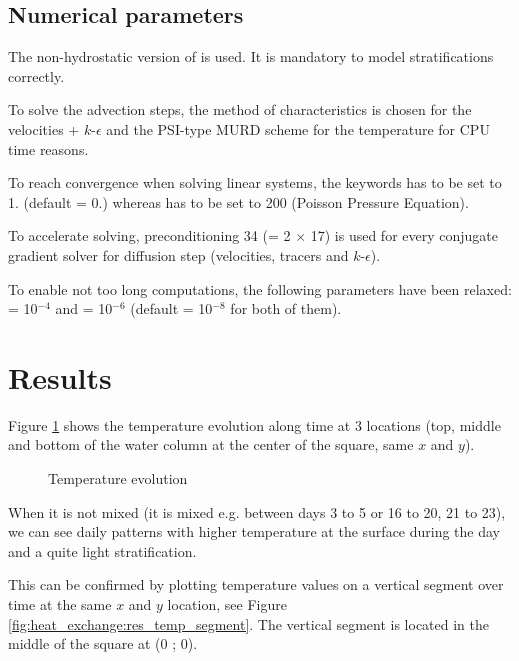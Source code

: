 \subsection{Numerical parameters}
%
The non-hydrostatic version of  is used.
It is mandatory to model stratifications correctly.

To solve the advection steps, the method of characteristics is chosen for the
velocities + $k$-$\epsilon$ and the PSI-type MURD scheme for the temperature
for CPU time reasons.

To reach convergence when solving linear systems, the keywords
 has to be set to 1. (default = 0.) whereas
 has to be set to 200 (Poisson
Pressure Equation).

To accelerate solving, preconditioning 34 (= 2 $\times$ 17) is used for
every conjugate gradient solver for diffusion step (velocities, tracers and
$k$-$\epsilon$).

To enable not too long computations, the following parameters have been relaxed:
 = 10$^{-4}$ and  = 10$^{-6}$
(default = 10$^{-8}$ for both of them).
%
%
\section{Results}
%
Figure \ref{fig:heat_exchange:res_evol} shows the temperature evolution along
time at 3 locations (top, middle and bottom of the water column at the center of
the square, same $x$ and $y$).

\begin{figure} [H]
\centering
{}
 \caption{Temperature evolution}
 \label{fig:heat_exchange:res_evol}
\end{figure}

When it is not mixed (it is mixed e.g. between days 3 to 5 or 16 to 20, 21 to 23),
we can see daily patterns with higher temperature at the surface during the day
and a quite light stratification.

This can be confirmed by plotting temperature values on a vertical segment
over time at the same $x$ and $y$ location,
see Figure \ref{fig:heat_exchange:res_temp_segment}.
The vertical segment is located in the middle of the square at (0 ; 0).

